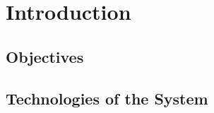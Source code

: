 \newpage
\thispagestyle{empty}
\mbox{}

\chapter{Introduction}
\label{appendixA}



\section{Objectives}
\label{makereferenceA.1}



\section{Technologies of the System}
\label{makereferenceA.2}
